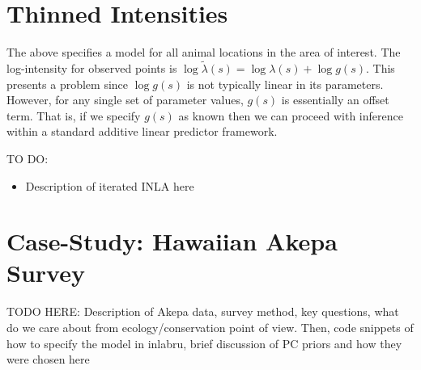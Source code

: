 \documentclass[preprint,12pt]{elsarticle}
\newcommand{\tl}{\tilde{\lambda}}   %
\begin{document}
\section*{Thinned Intensities}

The above specifies a model for all animal locations in the area of interest.  The log-intensity for observed points is $\log\tl(s) = \log\lambda(s) + \log g(s)$.  This presents a problem since $\log g(s)$ is not typically linear in its parameters. However, for any single set of parameter values, $g(s)$ is essentially an offset term.  That is, if we specify $g(s)$ as known then we can proceed with inference within a standard additive linear predictor framework.

TO DO:

\begin{itemize}
 \item Description of iterated INLA here
\end{itemize}

\section*{Case-Study:  Hawaiian Akepa Survey}

TODO HERE:  Description of Akepa data, survey method, key questions, what do we care about from ecology/conservation point of view.  Then, code snippets of how to specify the model in inlabru, brief discussion of PC priors and how they were chosen here


\bigskip
\end{document}
